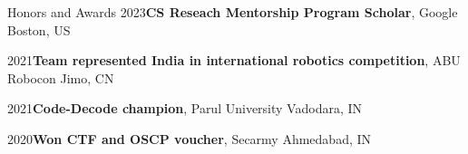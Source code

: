 \documentclass{resume}
\begin{document}





\begin{rSection}{Honors and Awards} 
{2023\hspace{1em}}{\bf CS Reseach Mentorship Program Scholar}{, Google} \hfill Boston, US \vspace{-0.5em}

{2021\hspace{1em}}{\bf Team represented India in international robotics competition}{, ABU Robocon} \hfill Jimo, CN \vspace{-0.5em}

{2021\hspace{1em}}{\bf Code-Decode champion}{, Parul University} \hfill Vadodara, IN \vspace{-0.5em}

{2020\hspace{1em}}{\bf Won CTF and OSCP voucher}{, Secarmy} \hfill Ahmedabad, IN \vspace{-0.5em}


\end{rSection}
\end{document}
